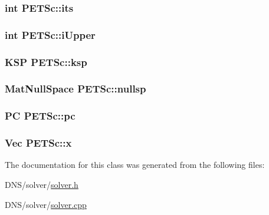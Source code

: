\subsubsection[{\texorpdfstring{its}{its}}]{\setlength{\rightskip}{0pt plus 5cm}int P\+E\+T\+Sc\+::its}\hypertarget{class_p_e_t_sc_ae696bc7363e6a44d72b77ddf2347c064}{}\label{class_p_e_t_sc_ae696bc7363e6a44d72b77ddf2347c064}
\subsubsection[{\texorpdfstring{i\+Upper}{iUpper}}]{\setlength{\rightskip}{0pt plus 5cm}int P\+E\+T\+Sc\+::i\+Upper}\hypertarget{class_p_e_t_sc_a2c5993a9de85ef65dccad96d2ba6d5bc}{}\label{class_p_e_t_sc_a2c5993a9de85ef65dccad96d2ba6d5bc}
\subsubsection[{\texorpdfstring{ksp}{ksp}}]{\setlength{\rightskip}{0pt plus 5cm}K\+SP P\+E\+T\+Sc\+::ksp}\hypertarget{class_p_e_t_sc_a1c5ed5de5f4e4bcea49b69120d62dc5d}{}\label{class_p_e_t_sc_a1c5ed5de5f4e4bcea49b69120d62dc5d}
\subsubsection[{\texorpdfstring{nullsp}{nullsp}}]{\setlength{\rightskip}{0pt plus 5cm}Mat\+Null\+Space P\+E\+T\+Sc\+::nullsp}\hypertarget{class_p_e_t_sc_a9ce148e91237cfc25a0c937979ce16ce}{}\label{class_p_e_t_sc_a9ce148e91237cfc25a0c937979ce16ce}
\subsubsection[{\texorpdfstring{pc}{pc}}]{\setlength{\rightskip}{0pt plus 5cm}PC P\+E\+T\+Sc\+::pc}\hypertarget{class_p_e_t_sc_aac480c264248fb503b91683ea53fbc99}{}\label{class_p_e_t_sc_aac480c264248fb503b91683ea53fbc99}
\subsubsection[{\texorpdfstring{x}{x}}]{\setlength{\rightskip}{0pt plus 5cm}Vec P\+E\+T\+Sc\+::x}\hypertarget{class_p_e_t_sc_aa09f3035eb06a26520c0c00e9cae1099}{}\label{class_p_e_t_sc_aa09f3035eb06a26520c0c00e9cae1099}


The documentation for this class was generated from the following files\+:\begin{DoxyCompactItemize}
\item 
D\+N\+S/solver/\hyperlink{solver_8h}{solver.\+h}\item 
D\+N\+S/solver/\hyperlink{solver_8cpp}{solver.\+cpp}\end{DoxyCompactItemize}
